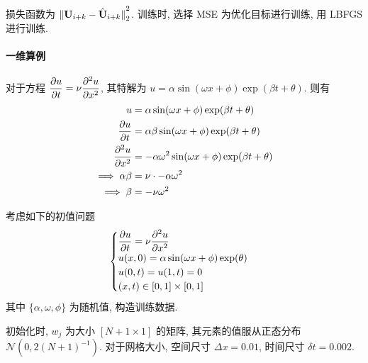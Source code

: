 \noindent 损失函数为 ${\| {{\mathbf U}_{i + k} - \hat {{\mathbf U}}_{i + k}} \|}_2^2$. 训练时, 选择
MSE 为优化目标进行训练, 用 LBFGS 进行训练.
\paragraph{一维算例}
对于方程 ${\dfrac{\partial {u}}{\partial {t}}} = \nu {\dfrac{\partial {^2u}}{\partial {x^2}}}$, 其特解为
$u = \alpha \sin(\omega x + \phi) \exp(\beta t + \theta)$. 则有
\[ \begin{aligned}
u &= \alpha \sin(\omega x + \phi) \exp(\beta t + \theta) \\
{\frac{\partial {u}}{\partial {t}}} &= \alpha \beta \sin(\omega x + \phi)
    \exp(\beta t + \theta) \\
{\frac{\partial {^2u}}{\partial {x^2}}} &= -\alpha \omega^2 \sin(\omega x + \phi)
    \exp(\beta t + \theta) \\
\implies \alpha \beta &= \nu \cdot -\alpha \omega^2 \\
\implies \beta &= -\nu \omega^2 \\
\end{aligned} \]

考虑如下的初值问题
\[ \begin{cases}
{\dfrac{\partial {u}}{\partial {t}}} = \nu {\dfrac{\partial {^2u}}{\partial {x^2}}} \\
u(x, 0) = \alpha \sin(\omega x + \phi) \exp(\theta) \\
u(0, t) = u(1, t) = 0 \\
(x, t) \in [0, 1] \times [0, 1] \\
\end{cases} \]
其中 $\{\alpha, \omega, \phi\}$ 为随机值, 构造训练数据. 

初始化时, $w_j$ 为大小 $[N + 1 \times 1]$ 的矩阵, 其元素的值服从正态分布
$\mathcal N(0, 2(N+1)^{-1})$. 对于网格大小, 空间尺寸 $\Delta x = 0.01$, 时间尺寸
$\delta t = 0.002$.
